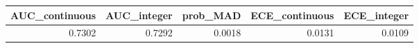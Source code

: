 \begin{tabular}{rrrrr}
\toprule
AUC_continuous & AUC_integer & prob_MAD & ECE_continuous & ECE_integer \\
\midrule
0.7302 & 0.7292 & 0.0018 & 0.0131 & 0.0109 \\
\bottomrule
\end{tabular}
